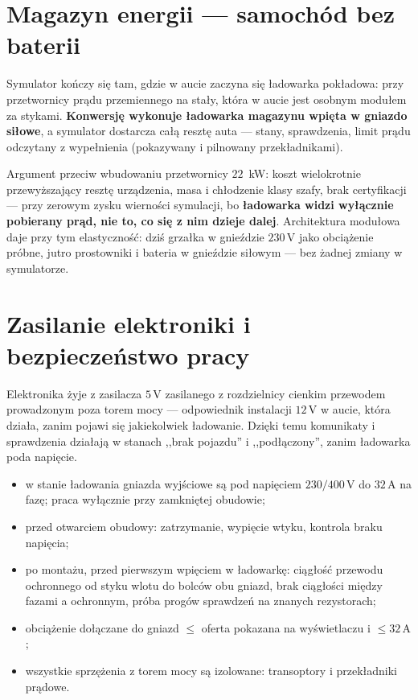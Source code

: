 \documentclass[a4paper,11pt]{article}
\newcommand{\volt}{\,\mathrm{V}}
\newcommand{\amp}{\,\mathrm{A}}
\begin{document}
\section{Magazyn energii --- samochód bez baterii}

Symulator kończy się tam, gdzie w aucie zaczyna się ładowarka pokładowa: przy
przetwornicy prądu przemiennego na stały, która w aucie jest osobnym modułem za
stykami. \textbf{Konwersję wykonuje ładowarka magazynu wpięta w gniazdo siłowe},
a symulator dostarcza całą resztę auta --- stany, sprawdzenia, limit prądu
odczytany z wypełnienia (pokazywany i pilnowany przekładnikami).

Argument przeciw wbudowaniu przetwornicy $22$~kW: koszt wielokrotnie przewyższający
resztę urządzenia, masa i chłodzenie klasy szafy, brak certyfikacji --- przy zerowym
zysku wierności symulacji, bo \textbf{ładowarka widzi wyłącznie pobierany prąd, nie
to, co się z nim dzieje dalej}. Architektura modułowa daje przy tym elastyczność:
dziś grzałka w gnieździe $230\volt$ jako obciążenie próbne, jutro prostowniki
i bateria w gnieździe siłowym --- bez żadnej zmiany w symulatorze.

\section{Zasilanie elektroniki i bezpieczeństwo pracy}

Elektronika żyje z zasilacza $5\volt$ zasilanego z rozdzielnicy cienkim przewodem
prowadzonym poza torem mocy --- odpowiednik instalacji $12\volt$ w aucie, która
działa, zanim pojawi się jakiekolwiek ładowanie. Dzięki temu komunikaty
i sprawdzenia działają w stanach ,,brak pojazdu'' i ,,podłączony'', zanim ładowarka
poda napięcie.

\begin{itemize}
\item w stanie ładowania gniazda wyjściowe są pod napięciem $230/400\volt$ do
      $32\amp$ na fazę; praca wyłącznie przy zamkniętej obudowie;
\item przed otwarciem obudowy: zatrzymanie, wypięcie wtyku, kontrola braku napięcia;
\item po montażu, przed pierwszym wpięciem w ładowarkę: ciągłość przewodu ochronnego
      od styku wlotu do bolców obu gniazd, brak ciągłości między fazami a ochronnym,
      próba progów sprawdzeń na znanych rezystorach;
\item obciążenie dołączane do gniazd $\le$ oferta pokazana na wyświetlaczu
      i $\le 32\amp$;
\item wszystkie sprzężenia z torem mocy są izolowane: transoptory i przekładniki
      prądowe.
\end{itemize}
\end{document}
